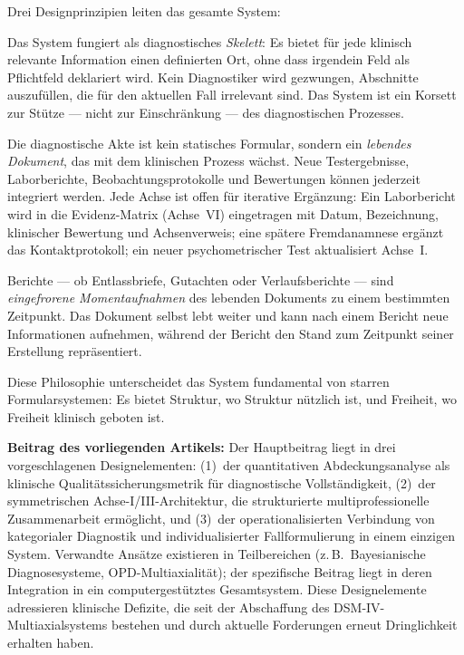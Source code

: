 \documentclass[11pt,a4paper]{article}
\begin{document}
Drei Designprinzipien leiten das gesamte System:

\begin{description}[style=nextline, leftmargin=1.5cm, font=\bfseries]
\item[Skelett-Prinzip] Das System fungiert als diagnostisches \textit{Skelett}: Es bietet f\"ur jede klinisch relevante Information einen definierten Ort, ohne dass irgendein Feld als Pflichtfeld deklariert wird. Kein Diagnostiker wird gezwungen, Abschnitte auszuf\"ullen, die f\"ur den aktuellen Fall irrelevant sind. Das System ist ein Korsett zur St\"utze --- nicht zur Einschr\"ankung --- des diagnostischen Prozesses.
\item[Lebendes Dokument] Die diagnostische Akte ist kein statisches Formular, sondern ein \textit{lebendes Dokument}, das mit dem klinischen Prozess w\"achst. Neue Testergebnisse, Laborberichte, Beobachtungsprotokolle und Bewertungen k\"onnen jederzeit integriert werden. Jede Achse ist offen f\"ur iterative Erg\"anzung: Ein Laborbericht wird in die Evidenz-Matrix (Achse~VI) eingetragen mit Datum, Bezeichnung, klinischer Bewertung und Achsenverweis; eine sp\"atere Fremdanamnese erg\"anzt das Kontaktprotokoll; ein neuer psychometrischer Test aktualisiert Achse~I.
\item[Bericht als Momentaufnahme] Berichte --- ob Entlassbriefe, Gutachten oder Verlaufsberichte --- sind \textit{eingefrorene Momentaufnahmen} des lebenden Dokuments zu einem bestimmten Zeitpunkt. Das Dokument selbst lebt weiter und kann nach einem Bericht neue Informationen aufnehmen, w\"ahrend der Bericht den Stand zum Zeitpunkt seiner Erstellung repr\"asentiert.
\end{description}

Diese Philosophie unterscheidet das System fundamental von starren Formularsystemen: Es bietet Struktur, wo Struktur n\"utzlich ist, und Freiheit, wo Freiheit klinisch geboten ist.

\textbf{Beitrag des vorliegenden Artikels:} Der Hauptbeitrag liegt in drei vorgeschlagenen Designelementen: (1)~der quantitativen Abdeckungsanalyse als klinische Qualit\"atssicherungsmetrik f\"ur diagnostische Vollst\"andigkeit, (2)~der symmetrischen Achse-I/III-Architektur, die strukturierte multiprofessionelle Zusammenarbeit erm\"oglicht, und (3)~der operationalisierten Verbindung von kategorialer Diagnostik und individualisierter Fallformulierung in einem einzigen System. Verwandte Ans\"atze existieren in Teilbereichen (z.\,B.\ Bayesianische Diagnosesysteme, OPD-Multiaxialit\"at); der spezifische Beitrag liegt in deren Integration in ein computergest\"utztes Gesamtsystem. Diese Designelemente adressieren klinische Defizite, die seit der Abschaffung des DSM-IV-Multiaxialsystems bestehen und durch aktuelle Forderungen \citep{ErlichFirst2025} erneut Dringlichkeit erhalten haben.
\end{document}
